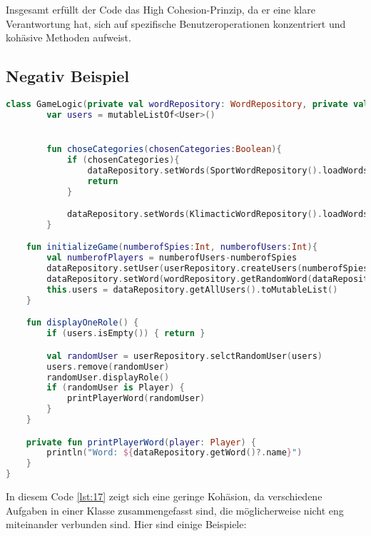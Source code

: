 Insgesamt erfüllt der Code das High Cohesion-Prinzip, da er eine klare Verantwortung hat, sich auf spezifische Benutzeroperationen konzentriert und kohäsive Methoden aufweist.


\subsection*{Negativ Beispiel}
\begin{lstlisting}[language=Kotlin, caption={High Cohesion}, label={lst:17}]
class GameLogic(private val wordRepository: WordRepository, private val dataRepository: DataRepository, private val userRepository: UserRepository) {
        var users = mutableListOf<User>()


        fun choseCategories(chosenCategories:Boolean){
            if (chosenCategories){
                dataRepository.setWords(SportWordRepository().loadWords())
                return
            }

            dataRepository.setWords(KlimacticWordRepository().loadWords())
        }

    fun initializeGame(numberofSpies:Int, numberofUsers:Int){
        val numberofPlayers = numberofUsers-numberofSpies
        dataRepository.setUser(userRepository.createUsers(numberofSpies, numberofPlayers))
        dataRepository.setWord(wordRepository.getRandomWord(dataRepository.getAllWords()))
        this.users = dataRepository.getAllUsers().toMutableList()
    }

    fun displayOneRole() {
        if (users.isEmpty()) { return }

        val randomUser = userRepository.selctRandomUser(users)
        users.remove(randomUser)
        randomUser.displayRole()
        if (randomUser is Player) {
            printPlayerWord(randomUser)
        }
    }

    private fun printPlayerWord(player: Player) {
        println("Word: ${dataRepository.getWord()?.name}")
    }
}
\end{lstlisting}

In diesem Code \ref{lst:17} zeigt sich eine geringe Kohäsion, da verschiedene Aufgaben in einer Klasse zusammengefasst sind, die möglicherweise nicht eng miteinander verbunden sind. Hier sind einige Beispiele:

